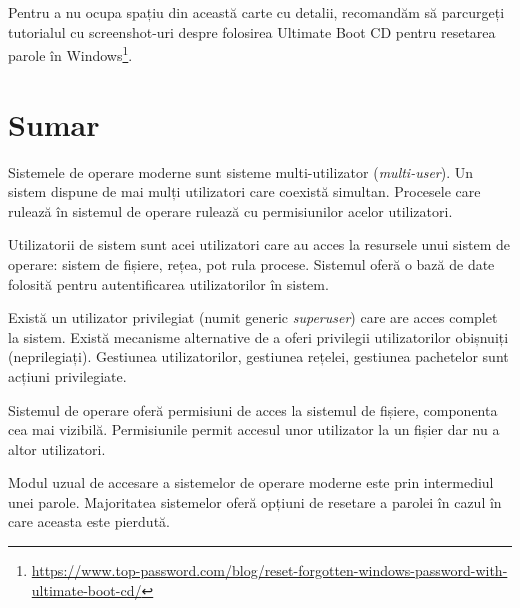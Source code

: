 Pentru a nu ocupa spațiu din această carte cu detalii, recomandăm să parcurgeți
tutorialul cu screenshot-uri despre folosirea Ultimate Boot CD pentru resetarea parole în Windows\footnote{\url{https://www.top-password.com/blog/reset-forgotten-windows-password-with-ultimate-boot-cd/}}.

\section{Sumar}
\label{sec:user:summary}

Sistemele de operare moderne sunt sisteme multi-utilizator (\textit{multi-user}). Un sistem dispune de mai mulți utilizatori care coexistă simultan. Procesele care rulează în sistemul de operare rulează cu permisiunilor acelor utilizatori.

Utilizatorii de sistem sunt acei utilizatori care au acces la resursele unui sistem de operare: sistem de fișiere, rețea, pot rula procese. Sistemul oferă o bază de date folosită pentru autentificarea utilizatorilor în sistem.

Există un utilizator privilegiat (numit generic \textit{superuser}) care are acces complet la sistem. Există mecanisme alternative de a oferi privilegii utilizatorilor obișnuiți (neprilegiați). Gestiunea utilizatorilor, gestiunea rețelei, gestiunea pachetelor sunt acțiuni privilegiate.

Sistemul de operare oferă permisiuni de acces la sistemul de fișiere, componenta cea mai vizibilă. Permisiunile permit accesul unor utilizator la un fișier dar nu a altor utilizatori.

Modul uzual de accesare a sistemelor de operare moderne este prin intermediul unei parole. Majoritatea sistemelor oferă opțiuni de resetare a parolei în cazul în care aceasta este pierdută.
